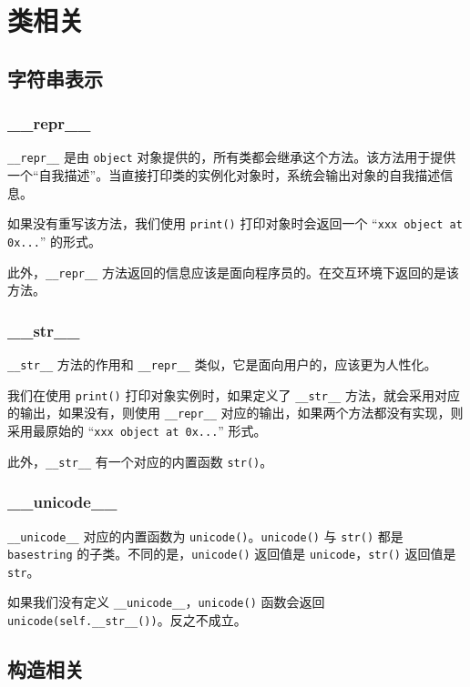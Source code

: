 \section{类相关}
\subsection{字符串表示}
\subsubsection{\_\_repr\_\_}

\texttt{\_\_repr\_\_} 是由 \texttt{object} 对象提供的，所有类都会继承这个方法。该方法用于提供一个``自我描述''。当直接打印类的实例化对象时，系统会输出对象的自我描述信息。

如果没有重写该方法，我们使用 \texttt{print()} 打印对象时会返回一个 ``\texttt{xxx object at 0x...}'' 的形式。

此外，\texttt{\_\_repr\_\_} 方法返回的信息应该是面向程序员的。在交互环境下返回的是该方法。

\subsubsection{\_\_str\_\_}

\texttt{\_\_str\_\_} 方法的作用和 \texttt{\_\_repr\_\_} 类似，它是面向用户的，应该更为人性化。

我们在使用 \texttt{print()} 打印对象实例时，如果定义了 \texttt{\_\_str\_\_} 方法，就会采用对应的输出，如果没有，则使用 \texttt{\_\_repr\_\_} 对应的输出，如果两个方法都没有实现，则采用最原始的  ``\texttt{xxx object at 0x...}'' 形式。

此外，\texttt{\_\_str\_\_} 有一个对应的内置函数 \texttt{str()}。 

\subsubsection{\_\_unicode\_\_}

\texttt{\_\_unicode\_\_} 对应的内置函数为 \texttt{unicode()}。\texttt{unicode()} 与 \texttt{str()} 都是 \texttt{basestring} 的子类。不同的是，\texttt{unicode()} 返回值是 \texttt{unicode}，\texttt{str()} 返回值是 \texttt{str}。

如果我们没有定义 \texttt{\_\_unicode\_\_}，\texttt{unicode()} 函数会返回 \texttt{unicode(self.\_\_str\_\_())}。反之不成立。

\subsection{构造相关}
